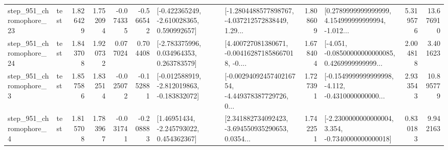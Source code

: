 \begin{tabular}{llrrrrllrlrr}
  step\_951\_chromophore\_23 &      test &      1.826429 &    1.752094 &     -0.074335 & -0.566542 &   [-0.422365249, -2.610028365, 0.590992657] &  [-1.2804488577898767, -4.037212572838449, 1.29... &       1.808609 &  [0.2789999999999999, 4.154999999999994, -1.012... &            5.319576 &         13.676910 \\
  step\_951\_chromophore\_24 &      test &      1.843708 &    1.920732 &      0.077024 &  0.704408 &    [-2.783375996, 0.034964353, 0.263783579] &  [4.400727081380671, -0.004162871858667018, -0.... &       1.678404 &  [-4.051, -0.08500000000000085, 0.4269999999999... &            2.004818 &          3.401623 \\
   step\_951\_chromophore\_3 &      test &      1.857586 &    1.832514 &     -0.025072 & -0.152881 &  [-0.012588919, -2.812019863, -0.183832072] &  [-0.0029409245740216754, -4.449378387729726, 0... &       1.727391 &  [-0.1549999999999998, -4.112, -0.4310000000000... &            2.933543 &         10.895779 \\
   step\_951\_chromophore\_4 &      test &      1.815708 &    1.783967 &     -0.031741 & -0.208883 &     [1.46951434, -2.245793022, 0.454362367] &  [2.341882734092423, -3.694550935290653, 0.0354... &       1.742251 &  [-2.2300000000000004, 3.354, -0.7340000000000018] &            0.830183 &          9.942163 \\
\bottomrule
\end{tabular}

